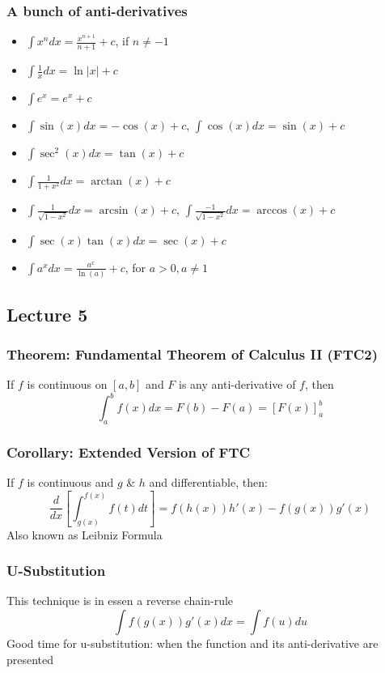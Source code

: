 \documentclass[12pt, letterpaper]{article}
\begin{document}
\subsubsection*{A bunch of anti-derivatives}
\begin{itemize}
    \item $\displaystyle\int x^n dx = \frac{x^{n+1}}{n+1} + c$, if $n\neq-1$
    \item $\displaystyle\int \frac{1}{x}dx = \ln|x|+c$
    \item $\displaystyle\int e^x = e^x+c$
    \item $\displaystyle\int \sin(x)dx = -\cos(x)+c$, $\displaystyle\int \cos(x)dx = \sin(x)+c$
    \item $\displaystyle\int \sec^2(x)dx = \tan(x)+c$
    \item $\displaystyle\int \frac{1}{1+x^2}dx = \arctan(x)+c$
    \item $\displaystyle\int \frac{1}{\sqrt{1-x^2}}dx = \arcsin(x)+c$, $\displaystyle\int \frac{-1}{\sqrt{1-x^2}}dx = \arccos(x)+c$
    \item $\displaystyle\int \sec(x)\tan(x)dx = \sec(x)+c$
    \item $\displaystyle\int a^x dx = \frac{a^x}{\ln (a)} + c$, for $a>0, a\neq 1$
\end{itemize}
\subsection{Lecture 5}
\subsubsection{Theorem: Fundamental Theorem of Calculus II (FTC2)}
If $f$ is continuous on $[a,b]$ and $F$ is any anti-derivative of $f$, then \[\displaystyle\int_{a}^{b}f(x)dx = F(b)-F(a) = [F(x)]_a^b\]
\subsubsection{Corollary: Extended Version of FTC}
If $f$ is continuous and $g$ \& $h$ and differentiable, then: 
\[\displaystyle\frac{d}{dx}[\int_{g(x)}^{f(x)}f(t)dt] = f(h(x))h'(x) - f(g(x))g'(x)\]
Also known as Leibniz Formula
\subsubsection{U-Substitution}
This technique is in essen a reverse chain-rule
\[\displaystyle\int f(g(x))g'(x)dx = \int f(u)du\]
Good time for u-substitution: when the function and its anti-derivative are presented
\end{document}
